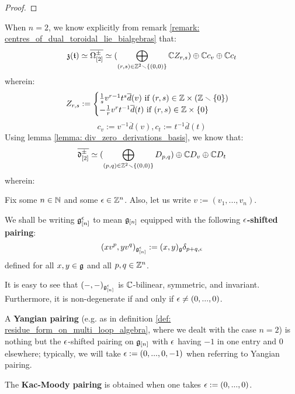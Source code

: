                 \begin{proof}
                    
                \end{proof}
            \begin{example}
                When $n = 2$, we know explicitly from remark \ref{remark: centres_of_dual_toroidal_lie_bialgebras} that:
                    $$\mathfrak{z}(\mathfrak{t}) \simeq \overline{\Omega_{[2]}^{\pm}} \simeq ( \bigoplus_{(r, s) \in \mathbb{Z}^2 \smallsetminus \{(0, 0)\}} \mathbb{C} Z_{r, s} ) \oplus \mathbb{C} c_v \oplus \mathbb{C} c_t$$
                wherein:
                    $$
                        Z_{r, s} :=
                        \begin{cases}
                            \text{$\frac1s v^{r - 1} t^s \overline{d}(v)$ if $(r, s) \in \Z \x (\Z \setminus \{0\})$}
                            \\
                            \text{$-\frac1r v^r t^{-1} \overline{d}(t)$ if $(r, s) \in \Z \x \{0\}$}
                        \end{cases}
                    $$
                    $$c_v := v^{-1} \overline{d}(v), c_t := t^{-1} \overline{d}(t)$$
                Using lemma \ref{lemma: div_zero_derivations_basis}, we know that:
                    $$\overline{\mathfrak{d}_{[2]}^{\pm}} \simeq ( \bigoplus_{(p, q) \in \mathbb{Z}^2 \smallsetminus \{(0, 0)\}} D_{p, q} ) \oplus \mathbb{C} D_v \oplus \mathbb{C} D_t$$
                wherein:
                    
            \end{example}
                
            \begin{definition} \label{def: shifted_pairings}
                Fix some $n \in \mathbb{N}$ and some $\epsilon \in \mathbb{Z}^n$. Also, let us write $v := (v_1, ..., v_n)$.

                We shall be writing $\mathfrak{g}_{[n]}^{\epsilon}$ to mean $\mathfrak{g}_{[n]}$ equipped with the following \textbf{$\epsilon$-shifted pairing}:
                    $$(x v^p, y v^q)_{\mathfrak{g}_{[n]}^{\epsilon}} := (x, y)_{\mathfrak{g}} \delta_{p + q, \epsilon}$$
                defined for all $x, y \in \mathfrak{g}$ and all $p, q \in \mathbb{Z}^n$. 
            \end{definition}
            \begin{remark}
                It is easy to see that $(-, -)_{\mathfrak{g}_{[n]}^{\epsilon}}$ is $\mathbb{C}$-bilinear, symmetric, and invariant. Furthermore, it is non-degenerate if and only if $\epsilon \not = (0, ..., 0)$.
            \end{remark}
            \begin{example}
                A \textbf{Yangian pairing} (e.g. as in definition \ref{def: residue_form_on_multi_loop_algebra}, where we dealt with the case $n = 2$) is nothing but the $\epsilon$-shifted pairing on $\mathfrak{g}_{[n]}$ with $\epsilon$ having $-1$ in one entry and $0$ elsewhere; typically, we will take $\epsilon := (0, ..., 0, -1)$ when referring to  Yangian pairing.
            \end{example}
            \begin{example}
                The \textbf{Kac-Moody pairing} is obtained when one takes $\epsilon := (0, ..., 0)$.
            \end{example}

